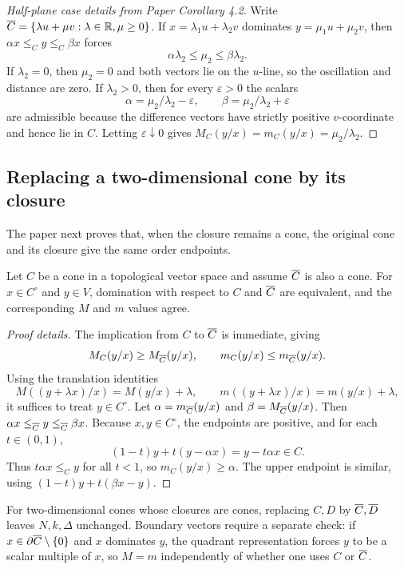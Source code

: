 \begin{proof}[Half-plane case details from Paper Corollary 4.2]
Write $\overline{C}=\{\lambda u+\mu v:\lambda\in\mathbb{R},
\mu\ge0\}$.
If $x=\lambda_1u+\lambda_2v$ dominates $y=\mu_1u+\mu_2v$, then $\alpha x\le_C y\le_C\beta x$ forces
\[
  \alpha\lambda_2\le \mu_2\le \beta\lambda_2.
\]
If $\lambda_2=0$, then $\mu_2=0$ and both vectors lie on the $u$-line, so the oscillation and distance are zero.
If $\lambda_2>0$, then for every $\varepsilon>0$ the scalars
\[
  \alpha=\mu_2/\lambda_2-\varepsilon,
  \qquad
  \beta=\mu_2/\lambda_2+\varepsilon
\]
are admissible because the difference vectors have strictly positive $v$-coordinate and hence lie in $C$.
Letting $\varepsilon\downarrow0$ gives
$M_C(y/x)=m_C(y/x)=\mu_2/\lambda_2$.
\end{proof}

\subsection{Replacing a two-dimensional cone by its closure}
The paper next proves that, when the closure remains a cone, the original cone and its closure give the same order endpoints.

\begin{lemma}
Let $C$ be a cone in a topological vector space and assume $\overline{C}$ is also a cone.
For $x\in C^\circ$ and $y\in V$, domination with respect to $C$ and $\overline{C}$ are equivalent, and the corresponding $M$ and $m$ values agree.
\end{lemma}

\begin{proof}[Proof details]
The implication from $C$ to $\overline{C}$ is immediate, giving
\[
  M_C(y/x)\ge M_{\overline{C}}(y/x),
  \qquad
  m_C(y/x)\le m_{\overline{C}}(y/x).
\]
Using the translation identities
\[
  M((y+\lambda x)/x)=M(y/x)+\lambda,
  \qquad
  m((y+\lambda x)/x)=m(y/x)+\lambda,
\]
it suffices to treat $y\in C^\circ$.
Let $\alpha=m_{\overline{C}}(y/x)$ and $\beta=M_{\overline{C}}(y/x)$.
Then $\alpha x\le_{\overline{C}}y\le_{\overline{C}}\beta x$.
Because $x,y\in C^\circ$, the endpoints are positive, and for each $t\in(0,1)$,
\[
  (1-t)y+t(y-\alpha x)=y-t\alpha x\in C.
\]
Thus $t\alpha x\le_C y$ for all $t<1$, so $m_C(y/x)\ge\alpha$.
The upper endpoint is similar, using $(1-t)y+t(\beta x-y)$.
\end{proof}

\begin{corollary}
For two-dimensional cones whose closures are cones, replacing $C,D$ by $\overline{C},\overline{D}$ leaves $N,k,\Delta$ unchanged.
Boundary vectors require a separate check: if $x\in\partial\overline{C}\setminus\{0\}$ and $x$ dominates $y$, the quadrant representation forces $y$ to be a scalar multiple of $x$, so $M=m$ independently of whether one uses $C$ or $\overline{C}$.
\end{corollary}

